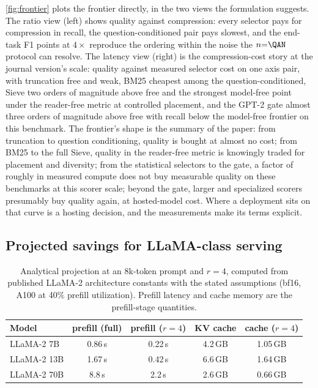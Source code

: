 \documentclass[preprint,12pt]{elsarticle}
\theoremstyle{remark}
\newcommand{\method}{Sieve}
\begin{document}
\autoref{fig:frontier} plots the frontier directly, in the two views
the formulation suggests. The ratio view (left) shows quality against
compression: every selector pays for compression in recall, the
question-conditioned pair pays slowest, and the end-task F1 points at
$4\times$ reproduce the ordering within the noise the $n{=}\QAN$
protocol can resolve. The latency view (right) is the
compression-cost story at the journal version's scale: quality against
measured selector cost on one axis pair, with truncation free and
weak, BM25 cheapest among the question-conditioned, \method{} two
orders of magnitude above free and the strongest model-free point
under the reader-free metric at controlled placement, and the GPT-2
gate almost three orders of magnitude above free with recall below
the model-free frontier on this benchmark. The frontier's shape is
the summary of the paper: from truncation to question conditioning,
quality is bought at almost no cost; from BM25 to the full
\method{}, quality in the reader-free metric is knowingly traded for
placement and diversity; from the statistical selectors to the gate,
a factor of roughly \GateSieRatioSixk{} in measured compute does not
buy measurable quality on these benchmarks at this scorer scale;
beyond the gate, larger and specialized scorers presumably buy
quality again, at hosted-model cost. Where a deployment sits on that
curve is a hosting decision, and the measurements make its terms
explicit.

\subsection{Projected savings for LLaMA-class serving}
\label{sec:projection}

\begin{table}[t]
\centering
\caption{Analytical projection at an 8k-token prompt and $r=4$,
computed from published LLaMA-2 architecture constants with the
stated assumptions (bf16, A100 at 40\% prefill utilization). Prefill
latency and cache memory are the prefill-stage quantities.}
\label{tab:projection}
\small
\begin{tabular}{lcccc}
\toprule
Model & prefill (full) & prefill ($r=4$) & KV cache & cache ($r=4$) \\
\midrule
LLaMA-2 7B & 0.86\,s & 0.22\,s & 4.2\,GB & 1.05\,GB \\
LLaMA-2 13B & 1.67\,s & 0.42\,s & 6.6\,GB & 1.64\,GB \\
LLaMA-2 70B & 8.8\,s & 2.2\,s & 2.6\,GB & 0.66\,GB \\
\bottomrule
\end{tabular}
\end{table}
\end{document}
